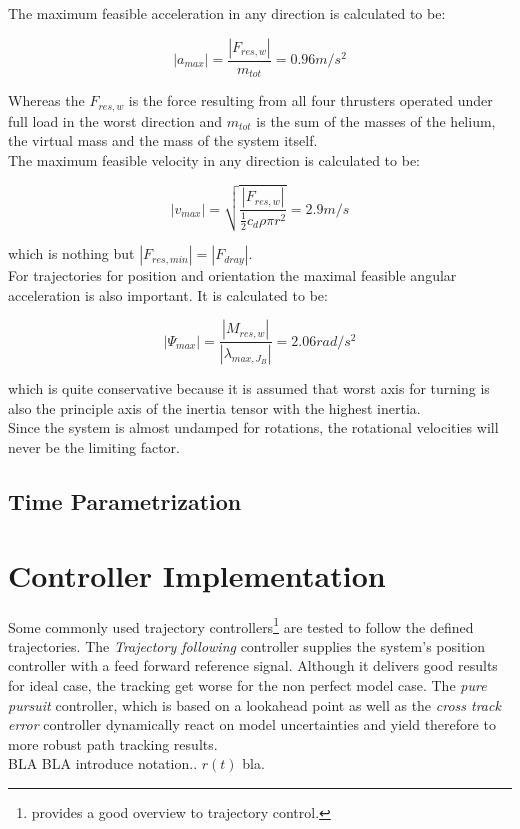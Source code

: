 The maximum feasible acceleration in any direction is calculated to be:

\begin{equation}
  \left|a_{max} \right| =  \frac{\left|F_{res, w}\right|}{m_{tot}} = 0.96 m/s^2
\end{equation}

Whereas the $F_{res,w}$ is the force resulting from all four thrusters operated under full load in the worst direction and $m_{tot}$ is the sum of the masses of the helium, the virtual mass and the mass of the system itself.\\


The maximum feasible velocity in any direction is calculated to be:

\begin{equation}
\left|v_{max} \right| = \sqrt{\frac{\left|F_{res,w} \right|}{\frac{1}{2}c_d \rho \pi r^2}}=2.9 m/s
\end{equation}

which is nothing but $ \left|F_{res,min} \right| = \left|F_{dray} \right| $.\\

For trajectories for position and orientation the maximal feasible angular acceleration is also important. It is calculated to be:

\begin{equation}
  \left|\Psi_{max} \right| =  \frac{\left|M_{res,w}\right|}{\left| \lambda_{max, J_{B}} \right|} = 2.06 rad/s^2 
\end{equation}

which is quite conservative because it is assumed that worst axis for turning is also the principle axis of the inertia tensor with the highest inertia.\\

Since the system is almost undamped for rotations, the rotational velocities will never be the limiting factor.

\subsection{Time Parametrization}

\section{Controller Implementation}
Some commonly used trajectory controllers\footnote{\cite{snider} provides a good overview to trajectory control.} are tested to follow the defined trajectories. The \textit{Trajectory following} controller supplies the system's position controller \cite{meier} with a feed forward reference signal. Although it delivers good results for ideal case, the tracking get worse for the non perfect model case. The \textit{pure pursuit} controller, which is based on a lookahead point as well as the \textit{cross track error} controller dynamically react on model uncertainties and yield therefore to more robust path tracking results.
\\
BLA BLA introduce notation.. $r(t)$ bla.

